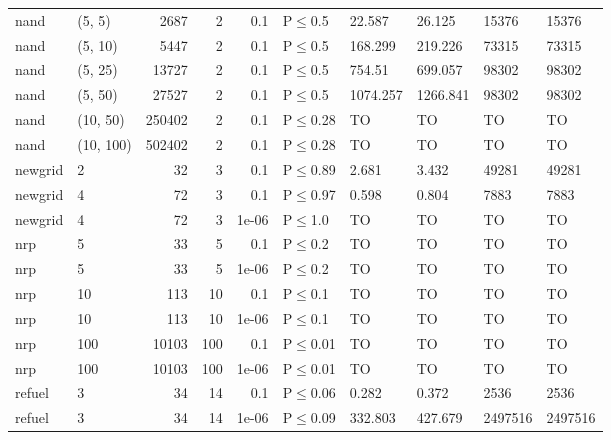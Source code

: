 \begin{longtable}{llrrrlllll}
 nand          & (5, 5)    &   	2687 &   2 & 0.1   & P$\leq$0.5   & 22.587   & 26.125   & 15376   & 15376   \\
 nand          & (5, 10)   &   	5447 &   2 & 0.1   & P$\leq$0.5   & 168.299  & 219.226  & 73315   & 73315   \\
 nand          & (5, 25)   &  	13727 &   2 & 0.1   & P$\leq$0.5   & 754.51   & 699.057  & 98302   & 98302   \\
 nand          & (5, 50)   &  	27527 &   2 & 0.1   & P$\leq$0.5   & 1074.257 & 1266.841 & 98302   & 98302   \\
 nand          & (10, 50)  & 	250402 &   2 & 0.1   & P$\leq$0.28  & TO       & TO       & TO      & TO      \\
 nand          & (10, 100) & 	502402 &   2 & 0.1   & P$\leq$0.28  & TO       & TO       & TO      & TO      \\
 newgrid       & 2         &     	32 &   3 & 0.1   & P$\leq$0.89  & 2.681    & 3.432    & 49281   & 49281   \\
 newgrid       & 4         &     	72 &   3 & 0.1   & P$\leq$0.97  & 0.598    & 0.804    & 7883    & 7883    \\
 newgrid       & 4         &     	72 &   3 & 1e-06 & P$\leq$1.0   & TO       & TO       & TO      & TO      \\
 nrp           & 5         &     	33 &   5 & 0.1   & P$\leq$0.2   & TO       & TO       & TO      & TO      \\
 nrp           & 5         &     	33 &   5 & 1e-06 & P$\leq$0.2   & TO       & TO       & TO      & TO      \\
 nrp           & 10        &    	113 &  10 & 0.1   & P$\leq$0.1   & TO       & TO       & TO      & TO      \\
 nrp           & 10        &    	113 &  10 & 1e-06 & P$\leq$0.1   & TO       & TO       & TO      & TO      \\
 nrp           & 100       &  	10103 & 100 & 0.1   & P$\leq$0.01  & TO       & TO       & TO      & TO      \\
 nrp           & 100       &  	10103 & 100 & 1e-06 & P$\leq$0.01  & TO       & TO       & TO      & TO      \\
 refuel        & 3         &     	34 &  14 & 0.1   & P$\leq$0.06  & 0.282    & 0.372    & 2536    & 2536    \\
 refuel        & 3         &     	34 &  14 & 1e-06 & P$\leq$0.09  & 332.803  & 427.679  & 2497516 & 2497516 \\
\bottomrule
\end{longtable}
